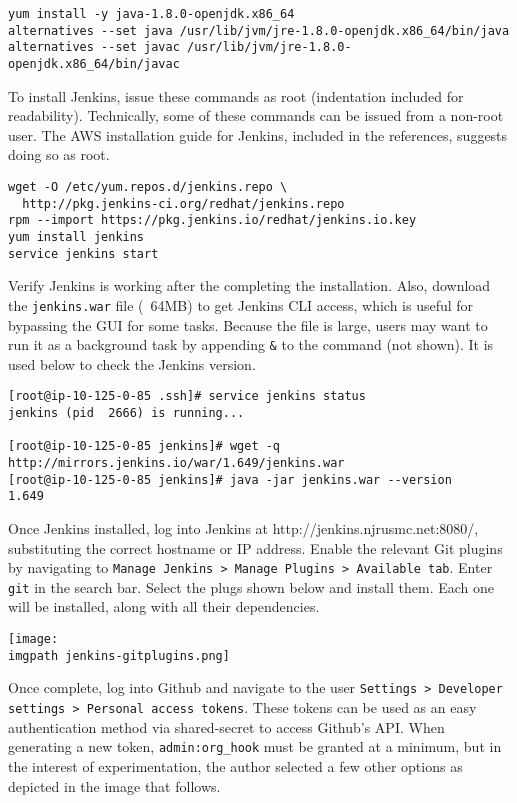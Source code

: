 \begin{verbatim}
yum install -y java-1.8.0-openjdk.x86_64
alternatives --set java /usr/lib/jvm/jre-1.8.0-openjdk.x86_64/bin/java
alternatives --set javac /usr/lib/jvm/jre-1.8.0-openjdk.x86_64/bin/javac
\end{verbatim}

To install Jenkins, issue these commands as root (indentation included for
readability). Technically, some of these commands can be issued from a
non-root user. The AWS installation guide for Jenkins, included in the
references, suggests doing so as root.

\begin{verbatim}
wget -O /etc/yum.repos.d/jenkins.repo \
  http://pkg.jenkins-ci.org/redhat/jenkins.repo
rpm --import https://pkg.jenkins.io/redhat/jenkins.io.key
yum install jenkins
service jenkins start
\end{verbatim}

Verify Jenkins is working after the completing the installation. Also,
download the \verb|jenkins.war| file (~64MB) to get Jenkins CLI access, which is
useful for bypassing the GUI for some tasks. Because the file is large, users
may want to run it as a background task by appending \verb|&| to the command
(not shown). It is used below to check the Jenkins version.

\begin{verbatim}
[root@ip-10-125-0-85 .ssh]# service jenkins status
jenkins (pid  2666) is running...

[root@ip-10-125-0-85 jenkins]# wget -q http://mirrors.jenkins.io/war/1.649/jenkins.war
[root@ip-10-125-0-85 jenkins]# java -jar jenkins.war --version
1.649
\end{verbatim}

Once Jenkins installed, log into Jenkins at http://jenkins.njrusmc.net:8080/,
substituting the correct hostname or IP address. Enable the relevant Git
plugins by navigating to \verb|Manage Jenkins > Manage Plugins > Available tab|.
Enter \verb|git| in the search bar. Select the plugs shown below and install
them. Each one will be installed, along with all their dependencies.

    \begin{minipage}[t]{\linewidth}
	  \centering
      \texttt{[image: \\imgpath jenkins-gitplugins.png]}
    \end{minipage}

Once complete, log into Github and navigate to the user
\verb|Settings > Developer settings > Personal access tokens|. These tokens
can be used as an easy authentication method via shared-secret to access
Github's API\@. When generating a new token, \verb|admin:org_hook| must be granted at a
minimum, but in the interest of experimentation, the author selected a few
other options as depicted in the image that follows.

